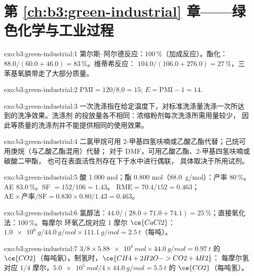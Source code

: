 \section*{第 \ref{ch:b3:green-industrial} 章——绿色化学与工业过程}

\begin{solution}{exo:b3:green-industrial:1}
第尔斯–阿尔德反应：100\,\%（加成反应）。酯化：$88.0/(60.0 + 46.0) = 83$\,\%。维蒂希反应：
$104.0/(106.0 + 276.0) = 27$\,\%，三苯基氧膦带走了大部分质量。
\end{solution}

\begin{solution}{exo:b3:green-industrial:2}
$\mathrm{PMI} = 120/8.0 = 15$; $E = \mathrm{PMI} - 1 = 14$.
\end{solution}

\begin{solution}{exo:b3:green-industrial:3}
一次洗涤指在给定温度下，对标准洗涤量洗涤一次所达到的洗净效果。洗涤剂
的投放量各不相同：浓缩粉剂每次洗涤所需用量较少，
因此等质量的洗涤剂并不能提供相同的使用效果。
\end{solution}

\begin{solution}{exo:b3:green-industrial:4}
二氯甲烷可用 2-甲基四氢呋喃或乙酸乙酯代替；己烷可用庚烷（与乙酸乙酯混用）代替；
对于 DMF，可用乙酸乙酯、2-甲基四氢呋喃或碳酸二甲酯，
也可在表面活性剂存在下于水中进行偶联，
具体取决于所用试剂。
\end{solution}

\begin{solution}{exo:b3:green-industrial:5}
酸 1.000 mol；酯 0.800 mol（\qty{88.0}{g/mol}）：产率 80\,\%。AE 83.0\,\%。SF $= 152/106 = 1.43$。
$\mathrm{RME} = 70.4/152 = 0.463$；$\mathrm{AE} \times \text{产率}/\mathrm{SF} = 0.830 \times 0.80/1.43 = 0.463$。
\end{solution}

\begin{solution}{exo:b3:green-industrial:6}
氯醇法：$44.0/(28.0 + 71.0 + 74.1) = 25$\,\%；直接氧化法：100\,\%。每摩尔
环氧乙烷对应 1 摩尔 $\ce{CaCl2}$：$\qty{1.0e6}{g}/\qty{44.0}{g/mol} \times \qty{111.1}{g/mol} = \qty{2.5}{t}$（每吨）。
\end{solution}

\begin{solution}{exo:b3:green-industrial:7}
$3/8 \times \qty{5.88e4}{mol} \times \qty{44.0}{g/mol} = \qty{0.97}{t}$ 的 $\ce{CO2}$（每吨氨）。制氢时，$\ce{CH4 + 2H2O -> CO2 + 4H2}$：
每摩尔氢对应 $1/4$ 摩尔，$\qty{5.0e5}{mol}/4 \times \qty{44.0}{g/mol} = \qty{5.5}{t}$ 的 $\ce{CO2}$（每吨氢）。
\end{solution}

